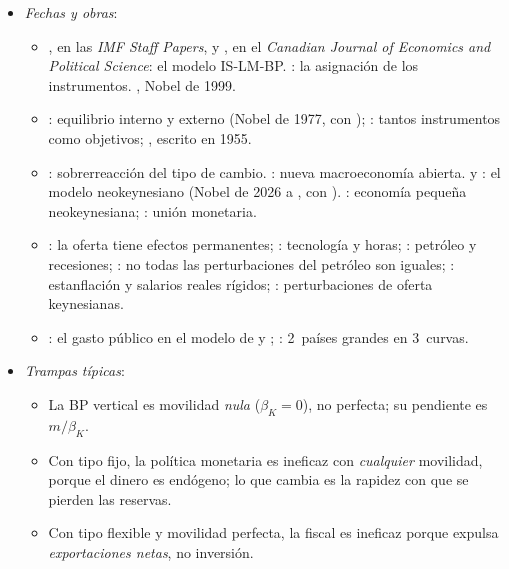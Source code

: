 \documentclass[11pt]{article}
\begin{document}
\begin{itemize}
\item \emph{Fechas y obras}:
  \begin{itemize}
  \item \textcite{Fleming1962Domestic}, en las \emph{IMF Staff Papers}, y \textcite{Mundell1963Capital}, en el \emph{Canadian Journal of Economics and Political Science}: el modelo IS-LM-BP. \textcite{Mundell1962Appropriate}: la asignación de los instrumentos. , Nobel de 1999.
  \item \textcite{Meade1951}: equilibrio interno y externo (Nobel de 1977, con ); \textcite{Tinbergen1952Theory}: tantos instrumentos como objetivos; \textcite{Swan1963Longer}, escrito en 1955.
  \item \textcite{Dornbusch1976Expectations}: sobrerreacción del tipo de cambio. \textcite{ObstfeldRogoff1995Redux}: nueva macroeconomía abierta. \textcite{ClaridaGaliGertler1999Science} y \textcite{Woodford2003Interest}: el modelo neokeynesiano (Nobel de 2026 a , con ). \textcite{GaliMonacelli2005Monetary}: economía pequeña neokeynesiana; \textcite{GaliMonacelli2008Optimal}: unión monetaria.
  \item \textcite{BlanchardQuah1989}: la oferta tiene efectos permanentes; \textcite{Gali1999Technology}: tecnología y horas; \textcite{Hamilton1983Oil}: petróleo y recesiones; \textcite{Kilian2009NotAll}: no todas las perturbaciones del petróleo son iguales; \textcite{BrunoSachs1985Economics}: estanflación y salarios reales rígidos; \textcite{GuerrieriEtAl2022}: perturbaciones de oferta keynesianas.
  \item \textcite{Furlanetto2006Fiscal}: el gasto público en el modelo de  y ; \textcite{CorsettiPesenti2005}: 2~países grandes en 3~curvas.
  \end{itemize}
\item \emph{Trampas típicas}:
  \begin{itemize}
  \item La BP vertical es movilidad \emph{nula} ($\beta_K=0$), no perfecta; su pendiente es $m/\beta_K$.
  \item Con tipo fijo, la política monetaria es ineficaz con \emph{cualquier} movilidad, porque el dinero es endógeno; lo que cambia es la rapidez con que se pierden las reservas.
  \item Con tipo flexible y movilidad perfecta, la fiscal es ineficaz porque expulsa \emph{exportaciones netas}, no inversión.

\end{itemize}
\end{itemize}
\end{document}
